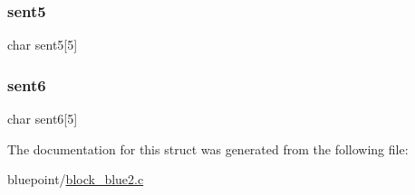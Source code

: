 \mbox{\label{structcentinel_a29e9e21b5605481d92556e86dce0d629}} 
\subsubsection{\texorpdfstring{sent5}{sent5}}
{\footnotesize\ttfamily char sent5\mbox{[}5\mbox{]}}

\mbox{\label{structcentinel_a0afdd5c01b65f31bf61887e95e4a5553}} 
\subsubsection{\texorpdfstring{sent6}{sent6}}
{\footnotesize\ttfamily char sent6\mbox{[}5\mbox{]}}



The documentation for this struct was generated from the following file\+:\begin{DoxyCompactItemize}
\item 
bluepoint/\hyperlink{block__blue2_8c}{block\+\_\+blue2.\+c}\end{DoxyCompactItemize}
